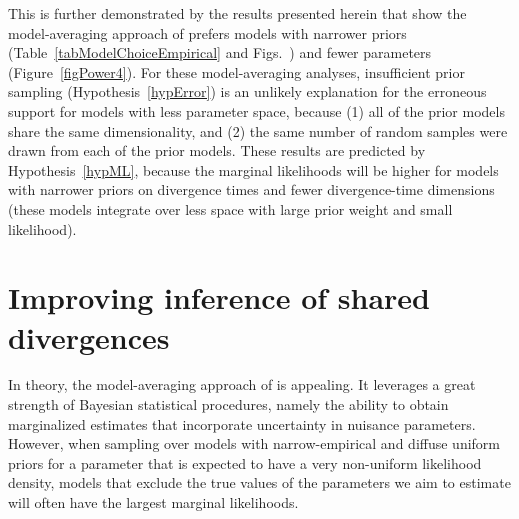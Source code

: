 This is further demonstrated by the results presented herein that show the
model-averaging approach of \citet{Hickerson2013} prefers models with narrower
\divt{} priors (Table~\ref{tabModelChoiceEmpirical} and
Figs.~)
and fewer \divt{} parameters (Figure~\ref{figPower4}).
For these model-averaging analyses, insufficient prior sampling
(Hypothesis~\ref{hypError}) is an unlikely explanation for the erroneous support
for models with less parameter space, because (1) all of the prior models share
the same dimensionality, and (2) the same number of random samples were drawn
from each of the prior models.
These results are predicted by Hypothesis~\ref{hypML}, because the marginal
likelihoods will be higher for models with narrower priors on divergence times
and fewer divergence-time dimensions (these models integrate over less space
with large prior weight and small likelihood).




\section{Improving inference of shared divergences}
In theory, the model-averaging approach of \citet{Hickerson2013} is appealing.
It leverages a great strength of Bayesian statistical procedures, namely the
ability to obtain marginalized estimates that incorporate uncertainty in
nuisance parameters.
However, when sampling over models with narrow-empirical and diffuse uniform
priors for a parameter that is expected to have a very non-uniform likelihood
density, models that exclude the true values of the parameters we aim to
estimate will often have the largest marginal likelihoods.

